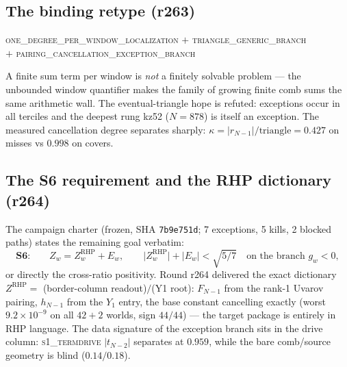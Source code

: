 \documentclass[11pt]{article}
\theoremstyle{definition}
\theoremstyle{remark}
\begin{document}
\subsection{The binding retype (r263)}
\begin{center}\small
\textsc{one\_degree\_per\_window\_localization} $+$
\textsc{triangle\_generic\_branch}\\
$+$ \textsc{pairing\_cancellation\_exception\_branch}
\end{center}
\noindent A finite sum term per
window is \emph{not} a finitely solvable problem --- the unbounded window
quantifier makes the family of growing finite comb sums the same
arithmetic wall.  The eventual-triangle hope is refuted: exceptions occur
in all terciles and the deepest rung kz52 ($N=878$) is itself an
exception.  The measured cancellation degree separates sharply:
$\kappa=|r_{N-1}|/\text{triangle}=0.427$ on misses vs $0.998$ on covers.

\subsection{The S6 requirement and the RHP dictionary (r264)}
The campaign charter (frozen, SHA \texttt{7b9e751d}; 7 exceptions, 5
kills, 2 blocked paths) states the remaining goal verbatim:
\[
\textbf{S6:}\qquad Z_w=Z^{\mathrm{RHP}}_w+E_w,\qquad
\bigl|Z^{\mathrm{RHP}}_w\bigr|+\bigl|E_w\bigr|<\sqrt{5/7}
\quad\text{on the branch } g_w<0,
\]
or directly the cross-ratio positivity.  Round r264 delivered the exact
dictionary $Z^{\mathrm{RHP}}=$ (border-column readout)$/$(Y1 root):
$F_{N-1}$ from the rank-1 Uvarov pairing, $h_{N-1}$ from the $Y_1$ entry,
the base constant cancelling exactly (worst $9.2\times10^{-9}$ on all
$42{+}2$ worlds, sign $44/44$) --- the target package is entirely in RHP
language.  The data signature of the exception branch sits in the drive
column: \textsc{s1\_termdrive} $|t_{N-2}|$ separates at $0.959$, while the
bare comb/source geometry is blind ($0.14/0.18$).
\end{document}
